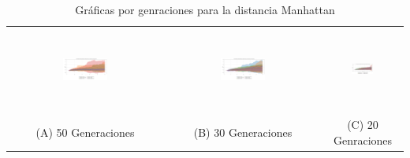 \documentclass[conference]{IEEEtran}
\begin{document}
\begin{table}[ht]
    \centering
    \caption{Gráficas por genraciones para la distancia Manhattan}
    \label{tab:graficas_generales_Manhattan}
    \begin{tabular}{ccc}
    \includegraphics[width=0.3\textwidth]{Manhattan/Fitness_Acumulado_Manh_50Gen.png} &

    \includegraphics[width=0.3\textwidth]{Manhattan/Fitness_Acumulado_Manh30Gen.png} &

    \includegraphics[width=0.3\textwidth, height=2.74cm]{Manhattan/Fitness_Acumulado_Manh_20Gen.png} \\

    (A) 50 Generaciones & (B) 30 Generaciones & (C) 20 Genraciones \\
    \end{tabular}
\end{table}
\end{document}
